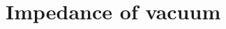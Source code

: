 \hypertarget{group___impedance_of_vacuum}{}\section{Impedance of vacuum}
\label{group___impedance_of_vacuum}

